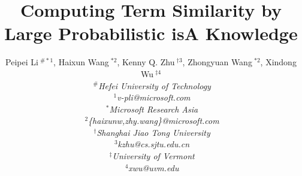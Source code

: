\documentclass{acm_proc_article-sp}%
\begin{document}
\title{Computing Term Similarity by Large Probabilistic isA Knowledge}
\author{%
{Peipei Li{\small $~^{\#*1}$}, Haixun Wang{\small $~^{*2}$}, Kenny Q. Zhu{\small $~^{\dag3}$}, Zhongyuan Wang{\small $~^{*2}$}, Xindong Wu{\small $~^{\ddag4}$} } %
\vspace{1.6mm}\\
\fontsize{10}{10}\selectfont\itshape
$~^{\#}$Hefei University of Technology\\
\fontsize{9}{9}\selectfont\ttfamily\upshape
$~^{1}$v-pli@microsoft.com\\
\fontsize{10}{10}\selectfont\rmfamily\itshape
$~^{*}$Microsoft Research Asia\\
\fontsize{9}{9}\selectfont\ttfamily\upshape
$~^{2}$\{haixunw,zhy.wang\}@microsoft.com\\
\fontsize{10}{10}\selectfont\rmfamily\itshape
$~^{\dag}$Shanghai Jiao Tong University\\
\fontsize{9}{9}\selectfont\ttfamily\upshape
$~^{3}$kzhu@cs.sjtu.edu.cn\\
\fontsize{10}{10}\selectfont\rmfamily\itshape
$~^{\ddag}$University of Vermont\\
\fontsize{9}{9}\selectfont\ttfamily\upshape
$~^{4}$xwu@uvm.edu }
\end{document}
